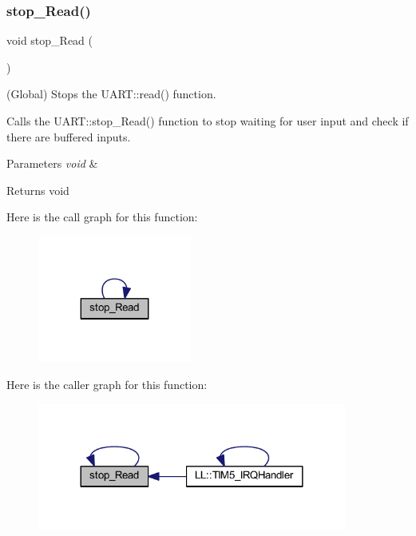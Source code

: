 \subsubsection{\texorpdfstring{stop\+\_\+\+Read()}{stop\_Read()}}
{\footnotesize\ttfamily void stop\+\_\+\+Read (\begin{DoxyParamCaption}{ }\end{DoxyParamCaption})}



(Global) Stops the U\+A\+R\+T\+::read() function. 

Calls the U\+A\+R\+T\+::stop\+\_\+\+Read() function to stop waiting for user input and check if there are buffered inputs.


\begin{DoxyParams}{Parameters}
{\em void} & \\
\hline
\end{DoxyParams}
\begin{DoxyReturn}{Returns}
void 
\end{DoxyReturn}
Here is the call graph for this function\+:\nopagebreak
\begin{figure}[H]
\begin{center}
\leavevmode
\includegraphics[width=143pt]{namespace_i_o_a04c5db8c053f07761c5c09894a4bd49d_cgraph}
\end{center}
\end{figure}
Here is the caller graph for this function\+:\nopagebreak
\begin{figure}[H]
\begin{center}
\leavevmode
\includegraphics[width=288pt]{namespace_i_o_a04c5db8c053f07761c5c09894a4bd49d_icgraph}
\end{center}
\end{figure}
\mbox{\label{namespace_i_o_a20b32a5769a95ed363726431c01702e9}} 
